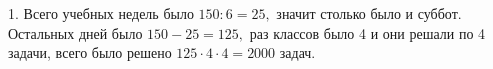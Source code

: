1. Всего учебных недель было $150:6=25,$ значит столько было и суббот. Остальных дней было $150-25=125,$ раз классов было 4 и они решали по 4 задачи, всего было решено $125\cdot4\cdot4=2000$ задач.\\
